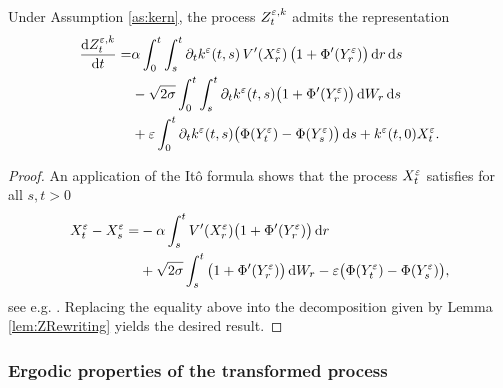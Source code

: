 \documentclass[10pt]{article}
\begin{document}
\begin{lemma}\label{lem:ZExpansion} Under Assumption \ref{as:kern}, the process $Z^{\varepsilon, k}_t$ admits the representation 
\begin{equation}
\begin{aligned}
	\frac{\mathrm{d} Z^{\varepsilon,k}_t}{\mathrm{d} t} = &\alpha \int_0^t\int_s^t \partial_t k^\varepsilon(t, s) \, V'(X^\varepsilon_r)\, \big(1 + \Phi'(Y^\varepsilon_r)\big)\,\mathrm{d} r \,\mathrm{d} s  \\
	&-\sqrt{2\sigma}\int_0^t\int_s^t \partial_t k^\varepsilon(t, s) \big(1 + \Phi'(Y^\varepsilon_r)\big) \,\mathrm{d} W_r \,\mathrm{d} s\\
	&+ \varepsilon \int_0^t \partial_t k^\varepsilon(t, s) \big(\Phi(Y^\varepsilon_t)- \Phi(Y^\varepsilon_s)\big) \,\mathrm{d} s + k^\varepsilon(t, 0) X^\varepsilon_t.
\end{aligned}
\end{equation}
\end{lemma}
\begin{proof} An application of the Itô formula shows that the process $X_t^\varepsilon$ satisfies for all $s, t > 0$
	\begin{equation}
	\begin{aligned}
		X^\varepsilon_t - X^\varepsilon_s = &-\alpha \int_s^t V'(X^\varepsilon_r)\big(1 + \Phi'(Y^\varepsilon_r)\big)\,\mathrm{d} r \\
		&+\sqrt{2\sigma}\int_s^t \big(1 + \Phi'(Y^\varepsilon_r)\big) \,\mathrm{d} W_r -\varepsilon \big(\Phi(Y^\varepsilon_t)- \Phi(Y^\varepsilon_s)\big),
	\end{aligned}
	\end{equation}
	see e.g. \cite[Equation (5.8)]{PaS07}. Replacing the equality above into the decomposition given by Lemma \ref{lem:ZRewriting} yields the desired result.
\end{proof}

\subsubsection{Ergodic properties of the transformed process}
\end{document}
